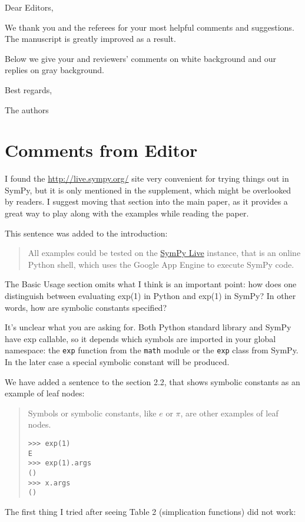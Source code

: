 \documentclass[answers,12pt]{exam}
\begin{document}
Dear Editors, \bigskip

We thank you and the referees for your most helpful comments and suggestions.
The manuscript is greatly improved as a result.

Below we give your and reviewers' comments on white background and our
replies on gray background. \bigskip

Best regards,\bigskip

The authors

\pagebreak

\section{Comments from Editor}

\begin{questions}
\question I found the \url{http://live.sympy.org/} site very convenient for trying things
out in SymPy, but it is only mentioned in the supplement, which might be
overlooked by readers. I suggest moving that section into the main paper, as
it provides a great way to play along with the examples while reading the
paper.
\begin{solution}
This sentence was added to the introduction:
\begin{quote}
All examples could be tested on the \href{http://live.sympy.org}{SymPy
Live} instance, that is an online Python shell, which uses the Google
App Engine to execute SymPy code.
\end{quote}
\end{solution}
\question The Basic Usage section omits what I think is an important point:
how does one distinguish between evaluating exp(1) in Python and exp(1) in
SymPy? In other words, how are symbolic constants specified?
\begin{solution}
  It's unclear what you are asking for. Both Python standard library and SymPy
  have exp callable, so it depends which symbols are imported in your global
  namespace: the \texttt{exp} function from the \texttt{math} module or the
  \texttt{exp} class from SymPy. In the later case a special symbolic constant
  will be produced.

We have added a sentence to the section 2.2, that shows symbolic
constants as an example of leaf nodes:
\begin{quote}
Symbols or symbolic constants, like $e$ or $\pi$, are other examples of
leaf nodes.
\begin{verbatim}
>>> exp(1)
E
>>> exp(1).args
()
>>> x.args
()
\end{verbatim}
\end{quote}
\end{solution}
\question The first
thing I tried after seeing Table 2 (simplication functions) did not work:


\end{questions}
\end{document}
